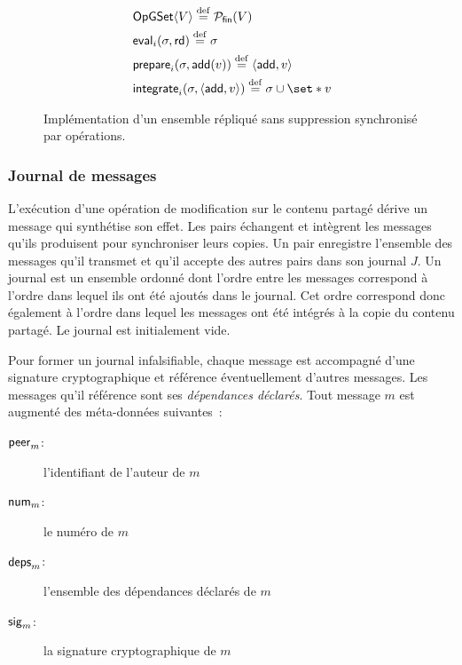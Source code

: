 \begin{figure}[bth]
\centering
\begin{align}
&\trm{OpGSet}\tuple*{V} \defeq \powerfset{V} \label{eq:op-gset-state}\\
&\trm{eval}_i(\sigma, \trm{rd}) \defeq \sigma \label{eq:op-gset-eval}\\
&\trm{prepare}_i(\sigma, \trm{add}(v)) \defeq \tuple*{\trm{add}, v} \label{eq:op-gset-prep-add}\\
&\trm{integrate}_i(\sigma, \tuple*{\trm{add}, v}) \defeq \sigma \cup \set*{v} \label{eq:op-gset-integr-add}
\end{align}
\caption[Implémentation d'un ensemble sans suppression répliqué synchronisé par opérations]{Implémentation d'un ensemble répliqué sans suppression synchronisé par opérations.}\label{fig:op-gset}
\end{figure}


\subsubsection{Journal de messages}

L'exécution d'une opération de modification sur le contenu partagé dérive un message qui synthétise son effet.
Les pairs échangent et intègrent les messages qu'ils produisent pour synchroniser leurs copies.
Un pair enregistre l'ensemble des messages qu'il transmet et qu'il accepte des autres pairs dans son journal $J$.
Un journal est un ensemble ordonné dont l'ordre entre les messages correspond à l'ordre dans lequel ils ont été ajoutés dans le journal.
Cet ordre correspond donc également à l'ordre dans lequel les messages ont été intégrés à la copie du contenu partagé.
Le journal est initialement vide.

Pour former un journal infalsifiable, chaque message est accompagné d'une signature cryptographique et référence éventuellement d'autres messages.
Les messages qu'il référence sont ses \emph{dépendances déclarés}.
Tout message $m$ est augmenté des méta-données suivantes~:
\begin{description}
    \item[$\operatorname{\mathsf{peer}}_m$:] l'identifiant de l'auteur de $m$ 
    \item[$\operatorname{\mathsf{num}}_m$:] le numéro de $m$
    \item[$\operatorname{\mathsf{deps}}_m$:] l'ensemble des dépendances déclarés de $m$
    \item[$\operatorname{\mathsf{sig}}_m$:] la signature cryptographique de $m$
\end{description}

